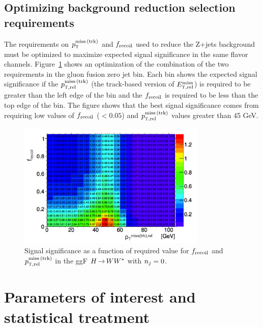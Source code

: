 \subsection{Optimizing background reduction selection requirements}

The requirements on $p_{\textrm{\footnotesize\sc t}}^{\rm miss\,(trk)}$ and $f_{\rm recoil}$ used to reduce the Z+jets background must be optimized to maximize expected signal significance in the same flavor channels. Figure~\ref{fig:optimization} shows an optimization of the combination of the two requirements in the gluon fusion zero jet bin. Each bin shows the expected signal significance if the $p_{{\textrm{\footnotesize\sc t}},{\rm rel}}^{\rm miss\,(trk)}$ (the track-based version of $E_{{\textrm{\footnotesize\sc t}},{\rm rel}}^{\rm miss}$) is required to be greater than the left edge of the bin and the $f_{\rm recoil}$ is required to be less than the top edge of the bin. The figure shows that the best signal significance comes from requiring low values of $f_{\rm recoil}$ ($< 0.05$) and $p_{{\textrm{\footnotesize\sc t}},{\rm rel}}^{\rm miss\,(trk)}$ values greater than 45 GeV. 

\begin{figure}[h!]
  \centering
  \captionsetup{justification=centering}

  \includegraphics[width=0.8\textwidth]{figures/SFoptimization}
  \caption{Signal significance as a function of required value for $f_{\rm recoil}$ and $p_{{\textrm{\footnotesize\sc t}},{\rm rel}}^{\rm miss\,(trk)}$ in the ggF $H{\,{\rightarrow}\,}WW^\ast$ with $n_j = 0$.}
  \label{fig:optimization}
\end{figure}


\section{Parameters of interest and statistical treatment}
 
